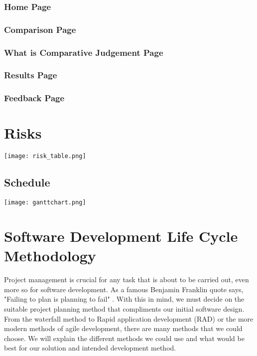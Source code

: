 \subsection{Home Page}

\subsection{Comparison Page}

\subsection{What is Comparative Judgement Page}

\subsection{Results Page}

\subsection{Feedback Page}


\chapter{Risks}


\begin{center}
	\texttt{[image: risk\_table.png]}
\end{center}




\begin{landscape}
	\chapter{Schedule}
		\texttt{[image: ganttchart.png]}
\end{landscape}

\chapter{Software Development Life Cycle Methodology}
Project management is crucial for any task that is about to be carried out, even more so for software development. As a famous Benjamin Franklin quote says, "Failing to plan is planning to fail" \cite{plan_to_fail}. With this in mind, we must decide on the suitable project planning method that compliments our initial software design. From the waterfall method to Rapid application development (RAD) or the more modern methods of agile development, there are many methods that we could choose. We will explain the different methods we could use and what would be best for our solution and intended development method.

